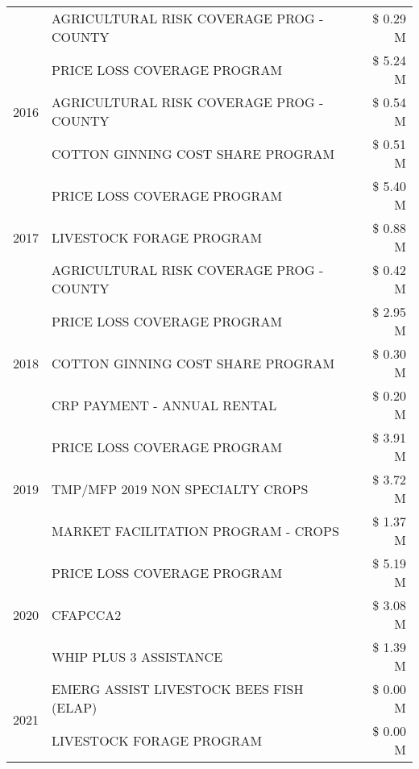 \begin{tabular}{llr}
 & AGRICULTURAL RISK COVERAGE PROG - COUNTY & \$ 0.29 M \\
\cline{1-3}
\multirow[t]{3}{*}{2016} & PRICE LOSS COVERAGE PROGRAM                   & \$ 5.24 M \\
 & AGRICULTURAL RISK COVERAGE PROG - COUNTY      & \$ 0.54 M \\
 & COTTON GINNING COST SHARE PROGRAM             & \$ 0.51 M \\
\cline{1-3}
\multirow[t]{3}{*}{2017} & PRICE LOSS COVERAGE PROGRAM & \$ 5.40 M \\
 & LIVESTOCK FORAGE PROGRAM & \$ 0.88 M \\
 & AGRICULTURAL RISK COVERAGE PROG - COUNTY & \$ 0.42 M \\
\cline{1-3}
\multirow[t]{3}{*}{2018} & PRICE LOSS COVERAGE PROGRAM & \$ 2.95 M \\
 & COTTON GINNING COST SHARE PROGRAM & \$ 0.30 M \\
 & CRP PAYMENT - ANNUAL RENTAL & \$ 0.20 M \\
\cline{1-3}
\multirow[t]{3}{*}{2019} & PRICE LOSS COVERAGE PROGRAM & \$ 3.91 M \\
 & TMP/MFP 2019 NON SPECIALTY CROPS & \$ 3.72 M \\
 & MARKET FACILITATION PROGRAM - CROPS & \$ 1.37 M \\
\cline{1-3}
\multirow[t]{3}{*}{2020} & PRICE LOSS COVERAGE PROGRAM & \$ 5.19 M \\
 & CFAPCCA2 & \$ 3.08 M \\
 & WHIP PLUS 3 ASSISTANCE & \$ 1.39 M \\
\cline{1-3}
\multirow[t]{2}{*}{2021} & EMERG ASSIST LIVESTOCK BEES FISH (ELAP) & \$ 0.00 M \\
 & LIVESTOCK FORAGE PROGRAM & \$ 0.00 M \\
\cline{1-3}
\bottomrule
\end{tabular}
